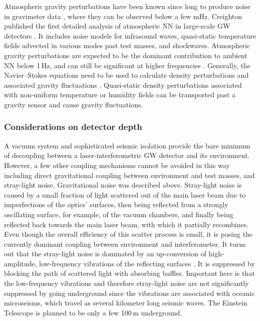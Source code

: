 Atmospheric gravity perturbations have been known since long to produce noise in gravimeter data \cite{Neu2010}, where they can be observed below a few mHz. Creighton published the first detailed analysis of atmospheric NN in large-scale GW detectors \cite{Cre2008}. It includes noise models for infrasound waves, quasi-static temperature fields advected in various modes past test masses, and shockwaves. Atmospheric gravity perturbations are expected to be the dominant contribution to ambient NN below 1\,Hz, and can still be significant at higher frequencies \cite{FiEA2018}. Generally, the Navier--Stokes equations need to be used to calculate density perturbations and associated gravity fluctuations \cite{Dav2004}. Quasi-static density perturbations associated with non-uniform temperature or humidity fields can be transported past a gravity sensor and cause gravity fluctuations. 

\subsubsection*{Considerations on detector depth}
\label{sec:depthNN}
A vacuum system and sophisticated seismic isolation provide the bare minimum of decoupling between a laser-interferometric GW detector and its environment. However, a few other coupling mechanisms cannot be avoided in this way including direct gravitational coupling between environment and test masses, and stray-light noise. Gravitational noise was described above. Stray-light noise is caused by a small fraction of light scattered out of the main laser beam due to imperfections of the optics' surfaces, then being reflected from a strongly oscillating surface, for example, of the vacuum chambers, and finally being reflected back towards the main laser beam, with which it partially recombines. Even though the overall efficiency of this scatter process is small, it is posing the currently dominant coupling between environment and interferometer. It turns out that the stray-light noise is dominated by an up-conversion of high-amplitude, low-frequency vibrations of the reflecting surfaces \cite{CaEA2013}. It is suppressed by blocking the path of scattered light with absorbing baffles. Important here is that the low-frequency vibrations and therefore stray-light noise are not significantly suppressed by going underground since the vibrations are associated with oceanic microseisms, which travel as several kilometer long seismic waves. The Einstein Telescope is planned to be only a few 100\,m underground. 

